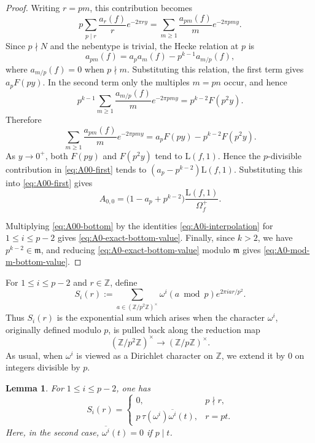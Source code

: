 \documentclass[11pt,table]{amsart}
\newtheorem{lemma}[theorem]{Lemma}
\newcommand{\Z}{\mathbb{Z}}
\numberwithin{equation}{section}
\begin{document}
\begin{proof}
Writing \(r=pm\), this contribution becomes
\[
        p\sum_{p\mid r}\frac{a_r(f)}r e^{-2\pi ry}
        =
        \sum_{m\geq1}\frac{a_{pm}(f)}m e^{-2\pi pmy}.
\]
Since \(p\nmid N\) and the nebentype is trivial, the Hecke relation at
\(p\) is
\[
        a_{pm}(f)
        =
        a_pa_m(f)-p^{k-1}a_{m/p}(f),
\]
where \(a_{m/p}(f)=0\) when \(p\nmid m\). Substituting this relation,
the first term gives \(a_pF(py)\). In the second term only the
multiples \(m=pn\) occur, and hence
\[
        p^{k-1}
        \sum_{m\geq1}
        \frac{a_{m/p}(f)}m e^{-2\pi pmy}
        =
        p^{k-2}F(p^2y).
\]
Therefore
\[
        \sum_{m\geq1}\frac{a_{pm}(f)}m e^{-2\pi pmy}
        =
        a_pF(py)-p^{k-2}F(p^2y).
\]
As \(y\to0^+\), both \(F(py)\) and \(F(p^2y)\) tend to
\(\mathrm{L}(f,1)\). Hence the \(p\)-divisible contribution in
\eqref{eq:A00-first} tends to
\((a_p-p^{k-2})\mathrm{L}(f,1)\). Substituting this into
\eqref{eq:A00-first} gives
\begin{equation}
\label{eq:A00-bottom}
        A_{0,0}
        =
        \bigl(1-a_p+p^{k-2}\bigr)
        \frac{\mathrm{L}(f,1)}{\Omega_f^+}.
\end{equation}

Multiplying \eqref{eq:A00-bottom} by the identities
\eqref{eq:A0i-interpolation} for \(1\leq i\leq p-2\) gives
\eqref{eq:A0-exact-bottom-value}. Finally, since \(k>2\), we have
\(p^{k-2}\in\mathfrak m\), and reducing
\eqref{eq:A0-exact-bottom-value} modulo \(\mathfrak m\) gives
\eqref{eq:A0-mod-m-bottom-value}.
\end{proof}

For \(1\leq i\leq p-2\) and \(r\in\Z\), define
\[
        S_i(r)
        :=
        \sum_{a\in(\Z/p^2\Z)^\times}
        \omega^i(a\bmod p)e^{2\pi i ar/p^2}.
\]
Thus \(S_i(r)\) is the exponential sum which arises when the
character \(\omega^i\), originally defined modulo \(p\), is pulled
back along the reduction map
\[
        (\Z/p^2\Z)^\times\longrightarrow(\Z/p\Z)^\times.
\]
As usual, when \(\omega^i\) is viewed as a Dirichlet character on
\(\Z\), we extend it by \(0\) on integers divisible by \(p\).

\begin{lemma}
\label{lem:inflated-gauss-sum}
For \(1\leq i\leq p-2\), one has
\begin{equation}
\label{eq:p2-inflated-gauss-sum}
        S_i(r)
        =
        \begin{cases}
        0,&p\nmid r,\\[3pt]
        p\,\tau(\omega^i)\overline{\omega^i}(t),&r=pt.
        \end{cases}
\end{equation}
Here, in the second case,
\(\overline{\omega^i}(t)=0\) if \(p\mid t\).
\end{lemma}
\end{document}
